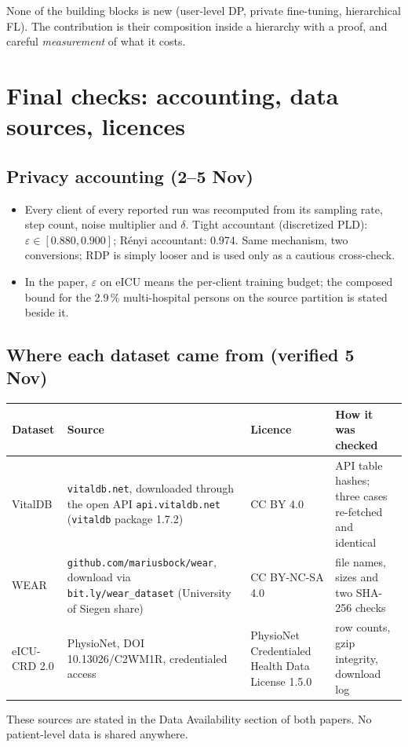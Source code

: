 \documentclass[11pt,a4paper]{article}
\begin{document}
None of the building blocks is new (user-level DP, private fine-tuning,
hierarchical FL). The contribution is their composition inside a hierarchy
with a proof, and careful \emph{measurement} of what it costs.

\section{Final checks: accounting, data sources, licences}\label{sec:checks}

\subsection{Privacy accounting (2--5 Nov)}
\begin{itemize}
\item Every client of every reported run was recomputed from its sampling rate,
step count, noise multiplier and $\delta$. Tight accountant (discretized PLD):
$\varepsilon \in [0.880, 0.900]$; R\'enyi accountant: 0.974. Same mechanism,
two conversions; RDP is simply looser and is used only as a cautious cross-check.
\item In the paper, $\varepsilon$ on eICU means the per-client training budget;
the composed bound for the 2.9\,\% multi-hospital persons on the source
partition is stated beside it.
\end{itemize}

\subsection{Where each dataset came from (verified 5 Nov)}
\begin{center}
\small
\begin{tabular}{P{0.14\textwidth} P{0.36\textwidth} P{0.18\textwidth} P{0.22\textwidth}}
\toprule
Dataset & Source & Licence & How it was checked \\
\midrule
VitalDB & \texttt{vitaldb.net}, downloaded through the open API \texttt{api.vitaldb.net} (\texttt{vitaldb} package 1.7.2) & CC BY 4.0 & API table hashes; three cases re-fetched and identical \\
WEAR & \texttt{github.com/mariusbock/wear}, download via \texttt{bit.ly/wear\_dataset} (University of Siegen share) & CC BY-NC-SA 4.0 & file names, sizes and two SHA-256 checks \\
eICU-CRD 2.0 & PhysioNet, DOI 10.13026/C2WM1R, credentialed access & PhysioNet Credentialed Health Data License 1.5.0 & row counts, gzip integrity, download log \\
\bottomrule
\end{tabular}
\end{center}
These sources are stated in the Data Availability section of both papers. No
patient-level data is shared anywhere.
\end{document}
